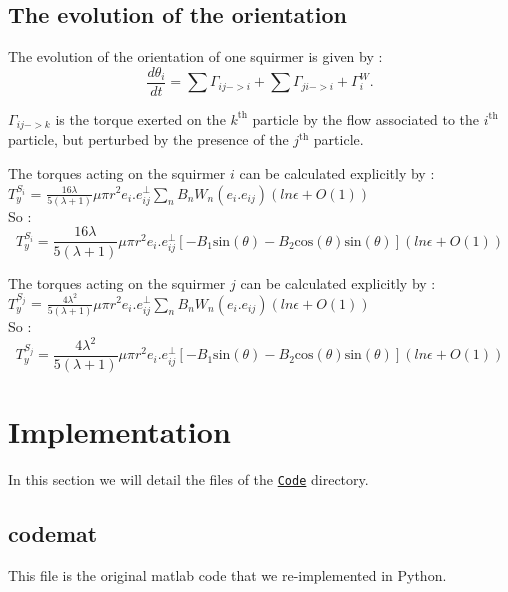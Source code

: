 \documentclass{article}
\begin{document}
\subsection{The evolution of the orientation}
The evolution of the orientation of one squirmer is given by : 
$$
\frac{d \theta_i}{dt} = \sum \Gamma_{ij->i} + \sum \Gamma_{ji->i} +  \Gamma_{i}^W.
$$

$\Gamma_{ij->k}$ is the torque exerted on the $k^\mathrm{th}$ particle by the flow associated to the $i^\mathrm{th}$ particle, but perturbed by the presence of the $j^\mathrm{th}$ particle.\\

\vspace{0.5cm}

The torques acting on the squirmer $i$ can be calculated explicitly by : \\
$T_y^{S_i}$ = $\frac{16 \lambda}{5(\lambda +1)} \mu \pi r^2 e_i.e^{\perp}_{ij}\sum_{n} B_n W_n(e_i.e_{ij}) (ln \epsilon + O(1))$ \cite{Brumley}
\\ So :
\begin{equation*}
    \boxed{T_y^{S_i} = \frac{16 \lambda}{5(\lambda +1)} \mu \pi r^2 e_i.e^{\perp}_{ij}\left[-B_1\mathrm{sin}(\theta) -B_2\mathrm{cos}(\theta)\mathrm{sin}(\theta) \right] (ln \epsilon + O(1))}
\end{equation*}

The torques acting on the squirmer $j$ can be calculated explicitly by : \\
$T_y^{S_j}$ = $\frac{4 \lambda^2}{5(\lambda +1)} \mu \pi r^2 e_i.e^{\perp}_{ij}\sum_{n} B_n W_n(e_i.e_{ij}) (ln \epsilon + O(1))$ \cite{Brumley}
\\ So :
\begin{equation*}
    \boxed{T_y^{S_j} = \frac{4 \lambda^2}{5(\lambda +1)} \mu \pi r^2 e_i.e^{\perp}_{ij}\left[-B_1\mathrm{sin}(\theta) -B_2\mathrm{cos}(\theta)\mathrm{sin}(\theta) \right] (ln \epsilon + O(1))}
\end{equation*}

\newpage
\section{Implementation}
In this section we will detail the files of the \texttt{\href{https://github.com/master-csmi/2024-m1-nemo/tree/main/Code}{Code}} directory.

\subsection{codemat}
This file is the original matlab code that we re-implemented in Python.
\end{document}
